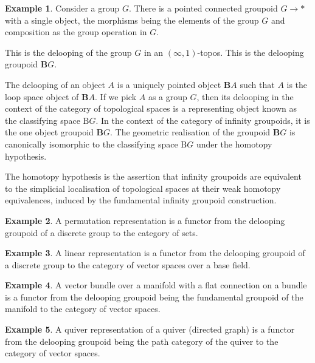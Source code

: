 \documentclass[10pt]{article}
\theoremstyle{plain}%
\theoremstyle{definition}
\newtheorem{example}{Example}[section]
\theoremstyle{remark}
\begin{document}
\begin{example}
	Consider a group $G$. There is a pointed connected groupoid $G \rightarrow *$ with a single object, the morphisms being the elements of the group $G$ and composition as the group operation in $G$.

	This is the delooping of the group $G$ in an $(\infty,1)$-topos. This is the delooping groupoid $\mathbf{B}G$.

	The delooping of an object $A$ is a uniquely pointed object $\mathbf{B}A$ such that $A$ is the loop space object of $\mathbf{B}A$. If we pick $A$ as a group $G$, then its delooping in the context of the category of topological spaces is a representing object known as the classifying space $\mathrm{B}G$. In the context of the category of infinity groupoids, it is the one object groupoid $\mathbf{B}G$. The geometric realisation of the groupoid $\mathbf{B}G$ is canonically isomorphic to the classifying space $\mathrm{B}G$ under the homotopy hypothesis.

	The homotopy hypothesis is the assertion that infinity groupoids are equivalent to the simplicial localisation of topological spaces at their weak homotopy equivalences, induced by the fundamental infinity groupoid construction.
\end{example}

\begin{example}
	A permutation representation is a functor from the delooping groupoid of a discrete group to the category of sets.
\end{example}

\begin{example}
	A linear representation is a functor from the delooping groupoid of a discrete group to the category of vector spaces over a base field.
\end{example}

\begin{example}
	A vector bundle over a manifold with a flat connection on a bundle is a functor from the delooping groupoid being the fundamental groupoid of the manifold to the category of vector spaces.
\end{example}

\begin{example}
	A quiver representation of a quiver (directed graph) is a functor from the delooping groupoid being the path category of the quiver to the category of vector spaces.
\end{example}
\end{document}
